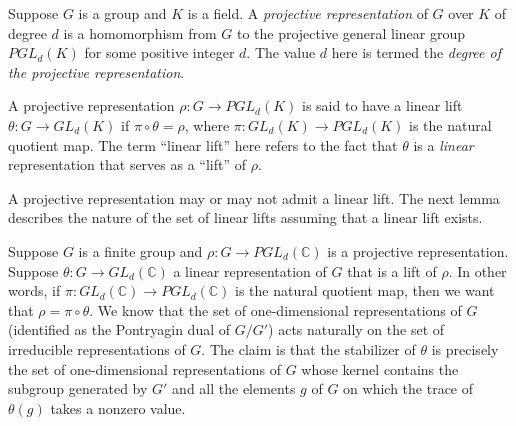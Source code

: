 \begin{definer}
  Suppose $G$ is a group and $K$ is a field. A {\em projective
    representation} of $G$ over $K$ of degree $d$ is a homomorphism
  from $G$ to the projective general linear group $PGL_d(K)$ for some
  positive integer $d$. The value $d$ here is termed the {\em degree
    of the projective representation}.

  A projective representation $\rho:G \to PGL_d(K)$ is said to have a
  linear lift $\theta:G \to GL_d(K)$ if $\pi \circ \theta = \rho$,
  where $\pi: GL_d(K) \to PGL_d(K)$ is the natural quotient map. The
  term ``linear lift'' here refers to the fact that $\theta$ is a {\em
    linear} representation that serves as a ``lift'' of $\rho$.
\end{definer}

A projective representation may or may not admit a linear lift. The
next lemma describes the nature of the set of linear lifts assuming
that a linear lift exists.

\begin{lemma}\label{stabilizer-kernel-description}
  Suppose $G$ is a finite group and $\rho:G \to PGL_d(\mathbb{C})$ is
  a projective representation. Suppose $\theta:G \to GL_d(\mathbb{C})$
  a linear representation of $G$ that is a lift of $\rho$. In other
  words, if $\pi: GL_d(\mathbb{C}) \to PGL_d(\mathbb{C})$ is the
  natural quotient map, then we want that $\rho = \pi \circ
  \theta$. We know that the set of one-dimensional representations of
  $G$ (identified as the Pontryagin dual of $G/G'$) acts naturally on
  the set of irreducible representations of $G$. The claim is that the
  stabilizer of $\theta$ is precisely the set of one-dimensional
  representations of $G$ whose kernel contains the subgroup generated
  by $G'$ and all the elements $g$ of $G$ on which the trace of
  $\theta(g)$ takes a nonzero value.
\end{lemma}

